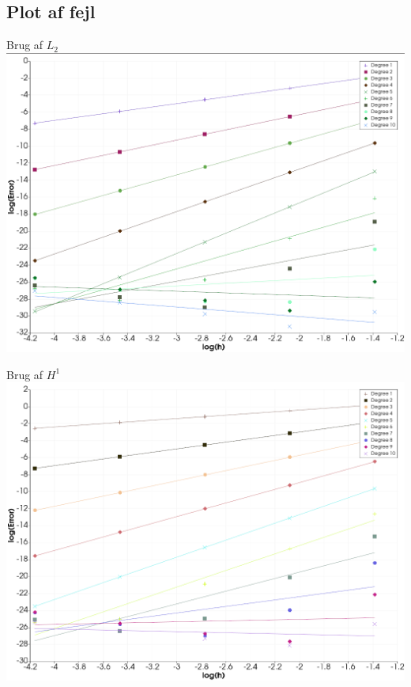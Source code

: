 \subsection{Plot af fejl}
\begin{frame}{Brug af $L_2$}
\includegraphics[width=\textwidth]{figurer/l2-fejl-plot.jpeg}    
\end{frame}
\begin{frame}{Brug af $H^1$}
   \includegraphics[width=\textwidth]{figurer/h1-fejl_plot.png} 
\end{frame}